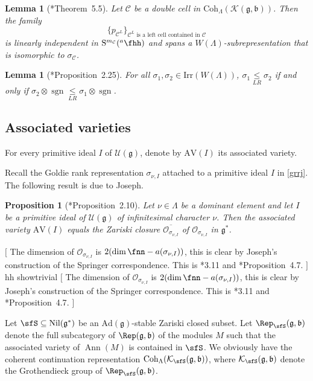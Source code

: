 \documentclass[12pt]{amsart}
\newcommand{\trivial}[2][]{\if\relax\detokenize{#1}\relax
  {%
      \color{orange} \vspace{0em}$[$#2$]$
      \color{black}
  }
  \else
\ifx#1h
\ifcsname showtrivial\endcsname
{%
    \color{orange}\vspace{0em}$[$#2$]$
    \color{black}
}
\fi
\else {\red Wrong argument!} \fi
\fi
}
\newcommand{\AV}{\mathrm{AV}}
\def\subset{\subseteq}
\newcommand{\CC}{{\mathcal {C}}}
\newcommand{\CK}{{\mathcal {K}}}
\newcommand{\CO}{{\mathcal {O}}}
\newcommand{\CU}{{\mathcal {U}}}
\DeclareMathOperator{\Ann}{Ann}
\newcommand{\sgn}{\operatorname{sgn}}
\newcommand{\g}{\mathfrak g}
\renewcommand{\b}{\mathfrak b}
\numberwithin{equation}{section}
\newtheorem{lem}[thm]{Lemma}
\newtheorem{prop}[thm]{Proposition}
\theoremstyle{remark}
\def\Irr{\mathrm{Irr}}
\def\hha{{}^a\fhh}
\def\Coh{\mathrm{Coh}}
\def\leqLR{\mathrel{\mathop{\leq}\limits_{\scriptscriptstyle LR}}}
\def\Inn{\mathrm{Ad}}
\begin{document}
\begin{lem}[\cite{J2}*{Theorem~5.5}]\label{dcrep33}
Let $\CC$ be a double cell in $\Coh_{\Lambda}( \CK(\g,\b))$. Then the family
\[
\{p_{\CC^L}\}_{\CC^L\textrm{ is a left cell contained in }\CC}
\]
is linearly independent in $\mathrm S^{m_\CC}(\hha)$ and spans a $W(\Lambda)$-subrepresentation that is isomorphic to $\sigma_\CC$.
\end{lem}



\begin{lem}[{\cite{BV2}*{Proposition~2.25}}]\label{lrd}
For all $\sigma_1, \sigma_2\in \Irr{(W(\Lambda))}$,
$\sigma_1\leqLR \sigma_2$ if and only if  $\sigma_2\otimes \sgn\leqLR \sigma_1\otimes \sgn$.
\end{lem}


\subsection{Associated varieties}\label{sec:ass}

For every primitive ideal $I$ of $\CU(\g)$, denote by
$\AV (I)$ its associated variety.

Recall the Goldie rank representation $\sigma_{\nu, I}$ attached to a primitive ideal $I$ in \eqref{grrj}.
The following result is due to Joseph.
\begin{prop}[\cite{J.av}*{Proposition~2.10}]\label{assv}
Let $\nu\in \Lambda$ be a dominant element and let $I$ be a primitive ideal of $\CU(\g)$  of infinitesimal character $\nu$.   Then the associated variety $\AV (I)$ equals the Zariski closure
$\overline{\CO_{\sigma_{\nu,I}}}$ of $\CO_{\sigma_{\nu,I}}$ in
$\g^*$.
\end{prop}
\trivial[h]{
The dimension of  $\CO_{\sigma_{\nu,I}}$ is $2(\dim \fnn - a(\sigma_{\nu,I}))$, this is clear by Joseph's construction of the Springer correspondence.
This is \cite{J.av}*{3.11} and \cite{J.hw}*{Proposition~4.7}.
}




Let $\sfS\subset \mathrm{Nil}(\g^*)$ be an $\Inn(\g)$-stable Zariski closed subset.
Let  $\Rep_\sfS(\g,\b)$ denote the full   subcategory of $\Rep(\g,\b)$ of the modules  $M$ such that the  associated variety of $\Ann(M)$  is contained in $\sfS$.
We obviously have the coherent continuation representation  $\Coh_{\Lambda}(\CK_\sfS(\g,\b))$, where $\CK_\sfS(\g,\b)$ denote the Grothendieck group of $\Rep_\sfS(\g,\b)$.
\end{document}
